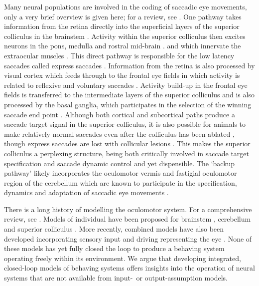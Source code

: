 \documentclass{frontiersSCNS}
\begin{document}
Many neural populations are involved in the coding of saccadic eye
movements, only a very brief overview is given here; for a review,
see \cite{munoz_commentary:_2002}. One pathway takes information from
the retina directly into the superficial layers of the superior
colliculus in the brainstem
\citep{sterling_receptive_1971,linden_massive_1983,wu_involvement_1994}.
Activity within the superior colliculus then excites neurons in the
pons, medulla and rostral mid-brain \citep{sparks_brainstem_2002}.
and  which innervate the extraocular muscles
\citep{fuchs_firing_1970,sparks_brainstem_2002}. This direct pathway
is responsible for the low latency saccades called express saccades
\citep{schiller_effect_1987,edelman_activity_1996}.
%
Information from the retina is also processed by visual cortex which
feeds through to the frontal eye fields in which activity is related
to reflexive and voluntary
saccades \citep{schall_neural_1999}. Activity build-up in the frontal
eye fields is transferred to the intermediate layers of the superior
colliculus
\citep{stanton_frontal_1988-1} and is also processed by the basal ganglia,
which participates in the selection of the winning saccade end point
\citep{stanton_frontal_1988,hikosaka_role_2000}.
%
Although both cortical and subcortical paths produce a saccade target
signal in the superior colliculus, it is also possible for animals to
make relatively normal saccades even after the colliculus has been
ablated
\citep{wurtz_activity_1972,aizawa_reversible_1998},
though express saccades are lost with collicular lesions
\citep{schiller_effect_1987}. This makes the superior colliculus
a perplexing structure, being both critically involved in saccade
target specification \citep{sparks_sensory_1987} and saccade dynamic control
\citep{waitzman_superior_1991,goossens_optimal_2012} and yet dispensible.
The `backup pathway' likely incorporates the oculomotor vermis and
fastigial oculomotor region of the cerebellum which are known to
participate in the specification, dynamics and adaptation of saccadic
eye movements \citep{kleine_saccade-related_2003,takagi_effects_1998}.

There is a long history of modelling the oculomotor system. For a
comprehensive review, see \cite{girard_brainstem_2005}. Models of
individual  have been proposed for brainstem
\citep{robinson_oculomotor_1975,scudder_new_1988,gancarz_neural_1998},
cerebellum \citep{quaia_model_1999,dean_modelling_1995,dean_learning_1994}
and superior colliculus
\citep{massone_neural-network_1994,arai_two-dimensional_1994,moren_mechanism_2013,marino_spatial_2012}.
More recently, combined models have also been developed incorporating
sensory input \citep{cope_basal_2017} and driving  representing the eye
\citep{tabareau_geometry_2007,nguyen_saccade_2014,thurat_biomimetic_2015}.
None of these models has yet fully closed the loop to produce a
behaving system operating freely within its environment. We argue that
developing integrated, closed-loop models of behaving systems offers
insights into the operation of neural systems that are not available
from input-~or output-assumption models.
\end{document}
